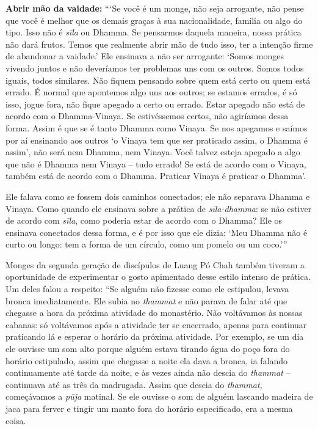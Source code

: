 \textbf{Abrir mão da vaidade:} ``\thinspace `Se você é um monge, não seja arrogante, não
pense que você é melhor que os demais graças à sua nacionalidade, família ou
algo do tipo. Isso não é \emph{sīla} ou Dhamma. Se pensarmos daquela maneira,
nossa prática não dará frutos. Temos que realmente abrir mão de tudo isso, ter a
intenção firme de abandonar a vaidade.' Ele ensinava a não ser arrogante: `Somos
monges vivendo juntos e não deveríamos ter problemas uns com os outros. Somos
todos iguais, todos similares. Não fiquem pensando sobre quem está certo ou quem
está errado. É normal que apontemos algo uns aos outros; se estamos errados, é
só isso, jogue fora, não fique apegado a certo ou errado. Estar apegado não está
de acordo com o Dhamma-Vinaya. Se estivéssemos certos, não agiríamos dessa
forma. Assim é que se é tanto Dhamma como Vinaya. Se nos apegamos e saímos por
aí ensinando aos outros `o Vinaya tem que ser praticado assim, o Dhamma é
assim', não será nem Dhamma, nem Vinaya. Você talvez esteja apegado a algo que
não é Dhamma nem Vinaya -- tudo errado! Se está de acordo com o Vinaya, também
está de acordo com o Dhamma. Praticar Vinaya é praticar o Dhamma'.

Ele falava como se fossem dois caminhos conectados; ele não separava
Dhamma e Vinaya. Como quando ele ensinava sobre a prática de
\emph{sīla-dhamma}: se não estiver de acordo com \emph{sīla}, como
poderia estar de acordo com o Dhamma? Ele os ensinava conectados dessa
forma, e é por isso que ele dizia: `Meu Dhamma não é curto ou longo: tem
a forma de um círculo, como um pomelo ou um coco.'\thinspace ''

Monges da segunda geração de discípulos de Luang Pó Chah também tiveram
a oportunidade de experimentar o gosto apimentado desse estilo intenso
de prática. Um deles falou a respeito: ``Se alguém não fizesse como ele
estipulou, levava bronca imediatamente. Ele subia no \emph{thammat} e
não parava de falar até que chegasse a hora da próxima atividade do
monastério. Não voltávamos às nossas cabanas: só voltávamos após a
atividade ter se encerrado, apenas para continuar praticando lá e
esperar o horário da próxima atividade. Por exemplo, se um dia ele
ouvisse um som alto porque alguém estava tirando água do poço fora do
horário estipulado, assim que chegasse a noite ela dava a bronca, ia
falando continuamente até tarde da noite, e às vezes ainda não descia do
\emph{thammat} -- continuava até as três da madrugada. Assim que descia
do \emph{thammat,} começávamos a \emph{pūja} matinal. Se ele ouvisse o
som de alguém lascando madeira de jaca para ferver e tingir um manto
fora do horário especificado, era a mesma coisa.

